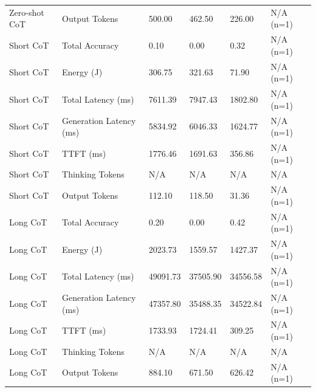 \begin{table}
\begin{tabular}{llllll}
Zero-shot CoT & Output Tokens & 500.00 & 462.50 & 226.00 & N/A (n=1) \\
Short CoT & Total Accuracy & 0.10 & 0.00 & 0.32 & N/A (n=1) \\
Short CoT & Energy (J) & 306.75 & 321.63 & 71.90 & N/A (n=1) \\
Short CoT & Total Latency (ms) & 7611.39 & 7947.43 & 1802.80 & N/A (n=1) \\
Short CoT & Generation Latency (ms) & 5834.92 & 6046.33 & 1624.77 & N/A (n=1) \\
Short CoT & TTFT (ms) & 1776.46 & 1691.63 & 356.86 & N/A (n=1) \\
Short CoT & Thinking Tokens & N/A & N/A & N/A & N/A \\
Short CoT & Output Tokens & 112.10 & 118.50 & 31.36 & N/A (n=1) \\
Long CoT & Total Accuracy & 0.20 & 0.00 & 0.42 & N/A (n=1) \\
Long CoT & Energy (J) & 2023.73 & 1559.57 & 1427.37 & N/A (n=1) \\
Long CoT & Total Latency (ms) & 49091.73 & 37505.90 & 34556.58 & N/A (n=1) \\
Long CoT & Generation Latency (ms) & 47357.80 & 35488.35 & 34522.84 & N/A (n=1) \\
Long CoT & TTFT (ms) & 1733.93 & 1724.41 & 309.25 & N/A (n=1) \\
Long CoT & Thinking Tokens & N/A & N/A & N/A & N/A \\
Long CoT & Output Tokens & 884.10 & 671.50 & 626.42 & N/A (n=1) \\
\bottomrule
\end{tabular}
\end{table}
